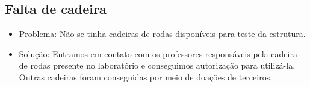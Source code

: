 \subsection{Falta de cadeira}
 \begin{itemize}
  \item Problema: Não se tinha cadeiras de rodas disponíveis para teste da estrutura.
  \item Solução: Entramos em contato com os professores responsáveis pela cadeira de rodas presente no laboratório e conseguimos autorização para utilizá-la. Outras cadeiras foram conseguidas por meio de doações de terceiros.

 \end{itemize}

\subsection{}
